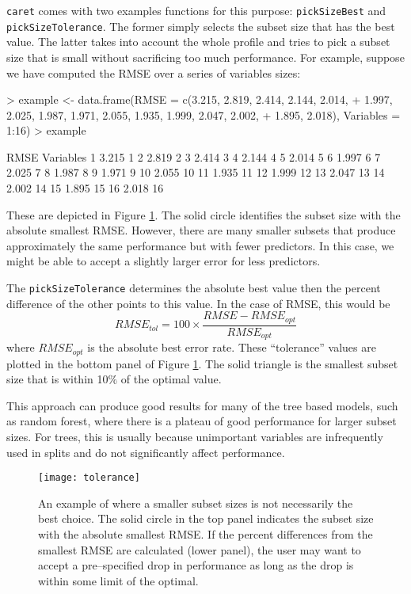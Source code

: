 \documentclass[12pt]{article}
\begin{document}
\texttt{caret} comes with two examples functions for this purpose: \texttt{pickSizeBest} and \texttt{pickSizeTolerance}. The former simply selects the subset size that has the best value. The latter takes into account the whole profile and tries to pick a subset size that is small without sacrificing too much performance. For example, suppose we have computed the RMSE over a series of variables sizes:
\begin{Schunk}
\begin{Sinput}
> example <- data.frame(RMSE = c(3.215, 2.819, 2.414, 2.144, 2.014, 
+     1.997, 2.025, 1.987, 1.971, 2.055, 1.935, 1.999, 2.047, 2.002, 
+     1.895, 2.018), Variables = 1:16)
> example
\end{Sinput}
\begin{Soutput}
    RMSE Variables
1  3.215         1
2  2.819         2
3  2.414         3
4  2.144         4
5  2.014         5
6  1.997         6
7  2.025         7
8  1.987         8
9  1.971         9
10 2.055        10
11 1.935        11
12 1.999        12
13 2.047        13
14 2.002        14
15 1.895        15
16 2.018        16
\end{Soutput}
\end{Schunk}
These are depicted in Figure \ref{F:tolerance}. The solid circle identifies the subset size with the absolute smallest RMSE. However, there are many smaller subsets that produce approximately the same performance but with fewer predictors. In this case, we might be able to accept a slightly larger error for less predictors.

The \texttt{pickSizeTolerance} determines the absolute best value then the percent difference of the other points to this value. In the case of RMSE, this would be
\[
RMSE_{tol} = 100\times \frac{RMSE - RMSE_{opt}}{RMSE_{opt}}
\]
where $RMSE_{opt}$ is the absolute best error rate. These ``tolerance'' values are plotted in the bottom panel of Figure  \ref{F:tolerance}. The solid triangle is the smallest subset size that is within 10$\%$ of the optimal value.

This approach can produce good results for many of the tree based models, such as random forest, where there is a plateau of good performance for larger subset sizes. For trees, this is usually because unimportant variables are infrequently used in splits and do not significantly affect performance.


\begin{figure}
   \begin{center}
      \texttt{[image: tolerance]}
      \caption{An example of where a smaller subset sizes is not necessarily the best choice. The solid circle in the top panel indicates the subset size with the absolute smallest RMSE. If the percent differences from the smallest RMSE  are calculated (lower panel), the user may want to accept a pre--specified drop in performance as long as the drop is within some limit of the optimal.}         
      \label{F:tolerance} 
    \end{center}
\end{figure}
\end{document}
